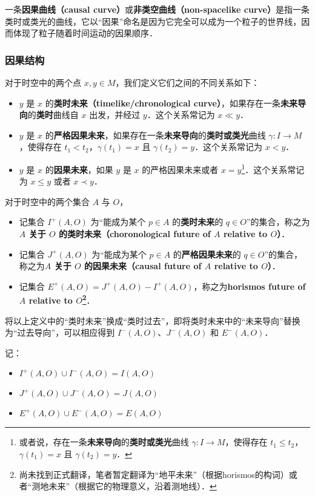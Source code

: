 一条\textbf{因果曲线（causal curve）}或\textbf{非类空曲线（non-spacelike curve）}是指一条类时或类光的曲线，它以“因果”命名是因为它完全可以成为一个粒子的世界线，因而体现了粒子随着时间运动的因果顺序．


\subsubsection{因果结构}

对于时空中的两个点 $x, y\in M$，我们定义它们之间的不同关系如下：

\begin{itemize}
\item $y$ 是 $x$ 的\textbf{类时未来（timelike/chronological curve）}，如果存在一条\textbf{未来导向}的\textbf{类时}曲线自 $x$ 出发，并经过 $y$．这个关系常记为 $x\ll y$．
\item $y$ 是 $x$ 的\textbf{严格因果未来}，如果存在一条\textbf{未来导向}的\textbf{类时或类光}曲线 $\gamma:I\rightarrow M$，使得存在 $t_1<t_2$，$\gamma(t_1)=x$ 且 $\gamma(t_2)=y$．这个关系常记为 $x< y$．
\item $y$ 是 $x$ 的\textbf{因果未来}，如果 $y$ 是 $x$ 的严格因果未来或者 $x=y$\footnote{或者说，存在一条\textbf{未来导向}的\textbf{类时或类光}曲线 $\gamma:I\rightarrow M$，使得存在 $t_1\leq t_2$，$\gamma(t_1)=x$ 且 $\gamma(t_2)=y$．}．这个关系常记为 $x\leq y$ 或者 $x\prec y$．
\end{itemize}

对于时空中的两个集合 $A$ 与 $O$，


\begin{itemize}
\item 记集合 $I^+(A, O)$ 为“能成为某个 $p\in A$ 的\textbf{类时未来}的 $q\in O$”的集合，称之为\textbf{$A$ 关于 $O$ 的类时未来（choronological future of $A$ relative to $O$）}．
\item 记集合 $J^+(A, O)$ 为“能成为某个 $p\in A$ 的\textbf{严格因果未来}的 $q\in O$”的集合，称之为\textbf{$A$ 关于 $O$ 的因果未来（causal future of $A$ relative to $O$）}．
\item 记集合 $E^+(A, O)=J^+(A, O)-I^+(A, O)$，称之为\textbf{horismos future of $A$ relative to $O$\footnote{尚未找到正式翻译，笔者暂定翻译为“地平未来”（根据horismos的构词）或者“测地未来”（根据它的物理意义，沿着测地线）．}}．
\end{itemize}

将以上定义中的“类时未来”换成“类时过去”，即将类时未来中的“未来导向”替换为“过去导向”，可以相应得到 $I^-(A, O)$、$J^-(A, O)$ 和 $E^-(A, O)$．

记：
\begin{itemize}
\item $I^+(A, O)\cup I^-(A, O)=I(A,O)$
\item $J^+(A, O)\cup J^-(A, O)=J(A,O)$
\item $E^+(A, O)\cup E^-(A, O)=E(A,O)$
\end{itemize}

